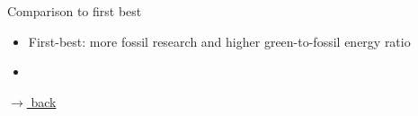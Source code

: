 \documentclass[11pt,aspectratio=169]{beamer}
\begin{document}
\begin{frame}{Comparison to first best}
\begin{figure}
\begin{subfigure}{0.45\textwidth}
	\end{subfigure}
\end{figure}
\vspace{1mm}
\begin{block}{}
	\begin{itemize}
		\item<+-> First-best: more fossil research and higher green-to-fossil energy ratio
		\item [] %
	\end{itemize}
\end{block}	

\vspace{-5.5mm}
\hfill	\hyperlink{mec}{\tiny{$\rightarrow$ back}}
\end{frame}
\end{document}
